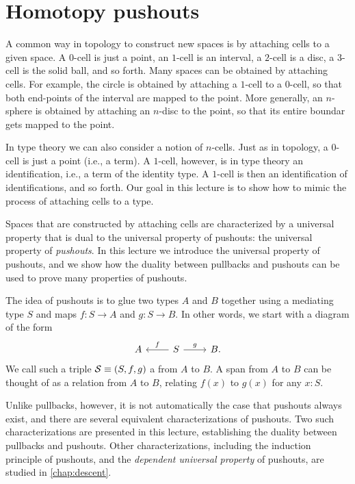 \chapter{Homotopy pushouts}

A common way in topology to construct new spaces is by attaching cells to a given space. A $0$-cell is just a point, an $1$-cell is an interval, a $2$-cell is a disc, a $3$-cell is the solid ball, and so forth. Many spaces can be obtained by attaching cells. For example, the circle is obtained by attaching a $1$-cell to a $0$-cell, so that both end-points of the interval are mapped to the point. More generally, an $n$-sphere is obtained by attaching an $n$-disc to the point, so that its entire boundar gets mapped to the point.

In type theory we can also consider a notion of $n$-cells. Just as in topology, a $0$-cell is just a point (i.e., a term). A $1$-cell, however, is in type theory an identification, i.e., a term of the identity type. A $1$-cell is then an identification of identifications, and so forth. Our goal in this lecture is to show how to mimic the process of attaching cells to a type.

Spaces that are constructed by attaching cells are characterized by a universal property that is dual to the universal property of pushouts: the universal property of \emph{pushouts}. In this lecture we introduce the universal property of pushouts, and we show how the duality between pullbacks and pushouts can be used to prove many properties of pushouts.

The idea of pushouts is to glue two types $A$ and $B$ together using a mediating type $S$ and maps $f:S\to A$ and $g:S\to B$. In other words, we start with a diagram of the form
\begin{equation*}
\begin{tikzcd}
A & S \arrow[l,swap,"f"] \arrow[r,"g"] & B.
\end{tikzcd}
\end{equation*}
We call such a triple $\mathcal{S}\equiv (S,f,g)$ a  from $A$ to $B$.
A span from $A$ to $B$ can be thought of as a relation from $A$ to $B$, relating $f(x)$ to $g(x)$ for any $x:S$.

Unlike pullbacks, however, it is not automatically the case that pushouts always exist, and there are several equivalent characterizations of pushouts. Two such characterizations are presented in this lecture, establishing the duality between pullbacks and pushouts. Other characterizations, including the induction principle of pushouts, and the \emph{dependent universal property} of pushouts, are studied in \cref{chap:descent}.

